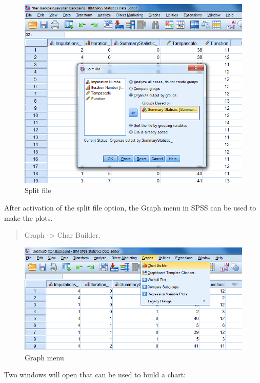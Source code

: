 \documentclass[]{book}
\theoremstyle{definition}
\theoremstyle{definition}
\theoremstyle{definition}
\theoremstyle{remark}
\begin{document}
\begin{figure}

{\centering \includegraphics[width=0.9\linewidth]{images/fig4.17} 

}

\caption{Split file}\label{fig:fig4-17}
\end{figure}

After activation of the split file option, the Graph menu in SPSS can be
used to make the plots.

\begin{quote}
Graph -\textgreater{} Char Builder.
\end{quote}

\begin{figure}

{\centering \includegraphics[width=0.9\linewidth]{images/fig4.13} 

}

\caption{Graph menu}\label{fig:fig4-13}
\end{figure}

Two windows will open that can be used to build a chart:
\end{document}
